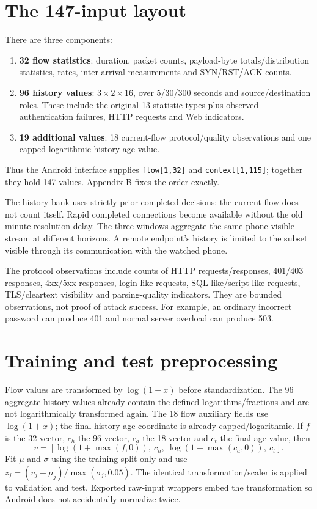 \documentclass[11pt,a4paper,oneside]{report}
\newcommand{\code}[1]{\nolinkurl{#1}}
\begin{document}
\section{The 147-input layout}
There are three components:
\begin{enumerate}
\item \textbf{32 flow statistics}: duration, packet counts, payload-byte totals/distribution statistics, rates, inter-arrival measurements and SYN/RST/ACK counts.
\item \textbf{96 history values}: $3\times2\times16$, over 5/30/300 seconds and source/destination roles. These include the original 13 statistic types plus observed authentication failures, HTTP requests and Web indicators.
\item \textbf{19 additional values}: 18 current-flow protocol/quality observations and one capped logarithmic history-age value.
\end{enumerate}
Thus the Android interface supplies \code{flow[1,32]} and \code{context[1,115]}; together they hold 147 values. Appendix B fixes the order exactly.

The history bank uses strictly prior completed decisions; the current flow does not count itself. Rapid completed connections become available without the old minute-resolution delay. The three windows aggregate the same phone-visible stream at different horizons. A remote endpoint's history is limited to the subset visible through its communication with the watched phone.

The protocol observations include counts of HTTP requests/responses, 401/403 responses, 4xx/5xx responses, login-like requests, SQL-like/script-like requests, TLS/cleartext visibility and parsing-quality indicators. They are bounded observations, not proof of attack success. For example, an ordinary incorrect password can produce 401 and normal server overload can produce 503.

\section{Training and test preprocessing}
Flow values are transformed by $\log(1+x)$ before standardization. The 96 aggregate-history values already contain the defined logarithms/fractions and are not logarithmically transformed again. The 18 flow auxiliary fields use $\log(1+x)$; the final history-age coordinate is already capped/logarithmic. If $f$ is the 32-vector, $c_h$ the 96-vector, $c_a$ the 18-vector and $c_t$ the final age value, then
\[v=[\log(1+\max(f,0)),\ c_h,\ \log(1+\max(c_a,0)),\ c_t].\]
Fit $\mu$ and $\sigma$ using the training split only and use $z_j=(v_j-\mu_j)/\max(\sigma_j,0.05)$. The identical transformation/scaler is applied to validation and test. Exported raw-input wrappers embed the transformation so Android does not accidentally normalize twice.
\end{document}
